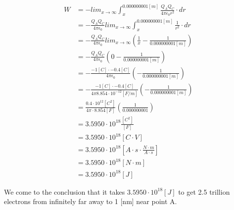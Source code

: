 \documentclass[paper=a4, fontsize=11pt]{scrartcl} %
\numberwithin{equation}{section} %
\numberwithin{figure}{section} %
\numberwithin{table}{section} %
\begin{document}
\begin{align} \label{eq:8}
W &= - lim_{x\to\infty} \int_x^{0.000000001[m]}{\frac{Q_A Q_C}{4 \pi \epsilon_0 r^2}} \cdot dr \\
  &= - \frac{Q_A Q_C}{4 \pi \epsilon_0 } lim_{x\to\infty} \int_x^{0.000000001[m]}{\frac{1}{r^2}} \cdot dr \\
  &= - \frac{Q_A Q_C}{4 \pi \epsilon_0 } lim_{x\to\infty} \left( \frac{1}{x} - \frac{1}{0.000000001[m]} \right) \\
  &= - \frac{Q_A Q_C}{4 \pi \epsilon_0 } \left( 0 - \frac{1}{0.000000001[m]} \right) \\
  &= - \frac{-1[C] \cdot -0.4[C]}{4 \pi \epsilon_0 } \left( - \frac{1}{0.000000001[m]} \right) \\
  &= - \frac{-1[C] \cdot -0.4[C]}{4 \pi 8.854 \cdot 10 ^ {-12} [F/m] } \left( - \frac{1}{0.000000001[m]} \right) \\
  &= \frac{0.4 \cdot 10 ^ {12} [C^2]}{4 \pi \cdot 8.854 [F]} \left( \frac{1}{0.000000001} \right) \\
  &= 3.5950 \cdot 10^{18} \frac{[C^2]}{[F]} \\
  &= 3.5950 \cdot 10^{18} [C \cdot V] \\
  &= 3.5950 \cdot 10^{18} \left[A \cdot s \cdot \frac{N \cdot m}{A \cdot s}\right] \\
  &= 3.5950 \cdot 10^{18} [N \cdot m] \\
  &= 3.5950 \cdot 10^{18} [J]
\end{align}

We come to the conclusion that it takes $3.5950 \cdot 10^{18} [J]$ to get 2.5 trillion electrons from infinitely far away
to 1 [nm] near point A.


\end{document}
